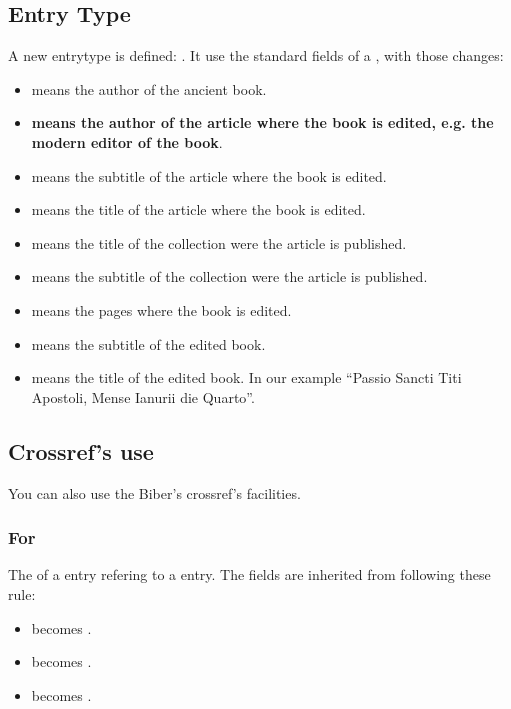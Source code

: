 \documentclass{ltxdockit}[2011/03/25]
\begin{document}
\subsection{ Entry Type}

A new entrytype is defined: . It use the standard fields of a , with those changes:

\begin{itemize}
	\item {} means the author of the ancient book.
	\item \textbf{ means the author of the article where the book is edited, e.g. the modern editor of the book}.
	\item {} means the subtitle of the article where the book is edited.
	\item {} means the title of the article where the book is edited. 
	\item {} means the title of the collection were the article is published.
	\item {} means the subtitle of the collection were the article is published.
	\item {} means the pages where the book is edited.
	\item {} means the subtitle of the edited book.
	\item {} means the title of the edited book. In our example \enquote{Passio Sancti Titi Apostoli, Mense Ianurii die Quarto}.


\end{itemize}


\subsection{Crossref's use}

You can also use the Biber's crossref's facilities.

\subsubsection{For }
The  of a  entry refering to a  entry. The fields are inherited from  following these rule:

\begin{itemize}
	\item {} becomes .
	\item {} becomes .
	\item {} becomes .

\end{itemize}
\end{document}
